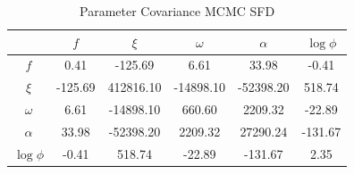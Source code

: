 \documentclass[apj]{aastex}
\begin{document}
{}

\begin{table}
    \centering
    \caption{Parameter Covariance MCMC SFD}
    \label{tab:parameter_covariance}
    \begin{tabular}{c|ccccc}
         & $f$ & $\xi$ & $\omega$ & $\alpha$ & $\log \phi$\\ 
        \hline
              $f$ &  0.41 & -125.69 &  6.61 & 33.98 & -0.41 \\ 
            $\xi$ & -125.69 & 412816.10 & -14898.10 & -52398.20 & 518.74 \\ 
         $\omega$ &  6.61 & -14898.10 & 660.60 & 2209.32 & -22.89 \\ 
         $\alpha$ & 33.98 & -52398.20 & 2209.32 & 27290.24 & -131.67 \\ 
        $\log \phi$ & -0.41 & 518.74 & -22.89 & -131.67 &  2.35 \\ 
        \hline
    \end{tabular}
\end{table}
\end{document}
